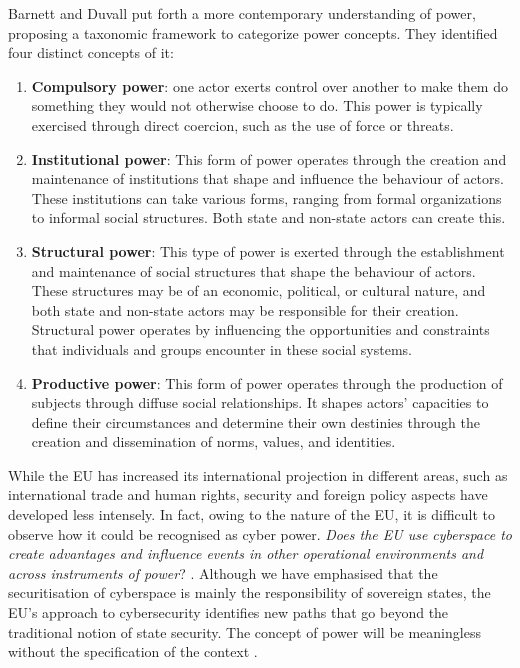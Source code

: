 Barnett and Duvall \textcite{barnett_2005_power} put forth a more contemporary understanding of power, proposing a taxonomic framework to categorize power concepts. They identified four distinct concepts of it:

\begin{enumerate}
    \item \textbf{Compulsory power}: one actor exerts control over another to make them do something they would not otherwise choose to do. This power is typically exercised through direct coercion, such as the use of force or threats.
    \item \textbf{Institutional power}: This form of power operates through the creation and maintenance of institutions that shape and influence the behaviour of actors. These institutions can take various forms, ranging from formal organizations to informal social structures. Both state and non-state actors can create this.
    \item \textbf{Structural power}: This type of power is exerted through the establishment and maintenance of social structures that shape the behaviour of actors. These structures may be of an economic, political, or cultural nature, and both state and non-state actors may be responsible for their creation. Structural power operates by influencing the opportunities and constraints that individuals and groups encounter in these social systems.
    \item \textbf{Productive power}: This form of power operates through the production of subjects through diffuse social relationships. It shapes actors’ capacities to define their circumstances and determine their own destinies through the creation and dissemination of norms, values, and identities.
\end{enumerate}

While the EU has increased its international projection in different areas, such as international trade and human rights, security and foreign policy aspects have developed less intensely. In fact, owing to the nature of the EU, it is difficult to observe how it could be recognised as cyber power. \textit{Does the EU use cyberspace to create advantages and influence events in other operational environments and across instruments of power}? \autocite[12]{kuehl_2009_from}. Although we have emphasised that the securitisation of cyberspace is mainly the responsibility of sovereign states, the EU's approach to cybersecurity identifies new paths that go beyond the traditional notion of state security. The concept of power will be meaningless without the specification of the context \autocite[454]{guzzini_1993_structural}. 

